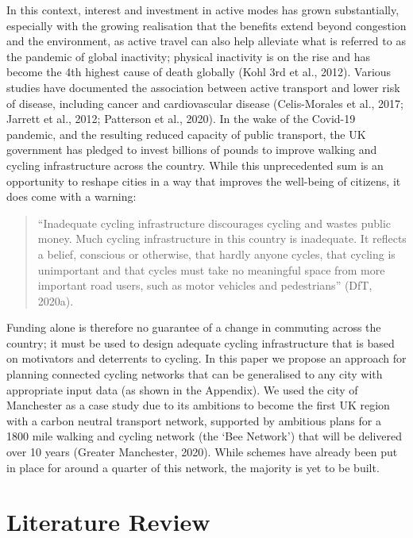 \documentclass[
]{article}
\begin{document}
In this context, interest and investment in active modes has grown substantially, especially with the growing realisation that the benefits extend beyond congestion and the environment, as active travel can also help alleviate what is referred to as the pandemic of global inactivity; physical inactivity is on the rise and has become the 4th highest cause of death globally (Kohl 3rd et al., 2012).
Various studies have documented the association between active transport and lower risk of disease, including cancer and cardiovascular disease (Celis-Morales et al., 2017; Jarrett et al., 2012; Patterson et al., 2020).
In the wake of the Covid-19 pandemic, and the resulting reduced capacity of public transport, the UK government has pledged to invest billions of pounds to improve walking and cycling infrastructure across the country.
While this unprecedented sum is an opportunity to reshape cities in a way that improves the well-being of citizens, it does come with a warning:

\begin{quote}
``Inadequate cycling infrastructure discourages cycling and wastes public money. Much cycling infrastructure in this country is inadequate. It reflects a belief, conscious or otherwise, that hardly anyone cycles, that cycling is unimportant and that cycles must take no meaningful space from more important road users, such as motor vehicles and pedestrians'' (DfT, 2020a).
\end{quote}

Funding alone is therefore no guarantee of a change in commuting across the country; it must be used to design adequate cycling infrastructure that is based on motivators and deterrents to cycling.
In this paper we propose an approach for planning connected cycling networks that can be generalised to any city with appropriate input data (as shown in the Appendix).
We used the city of Manchester as a case study due to its ambitions to become the first UK region with a carbon neutral transport network, supported by ambitious plans for a 1800 mile walking and cycling network (the `Bee Network') that will be delivered over 10 years (Greater Manchester, 2020).
While schemes have already been put in place for around a quarter of this network, the majority is yet to be built.

\hypertarget{literature-review}{%
\section{Literature Review}\label{literature-review}}
\end{document}
